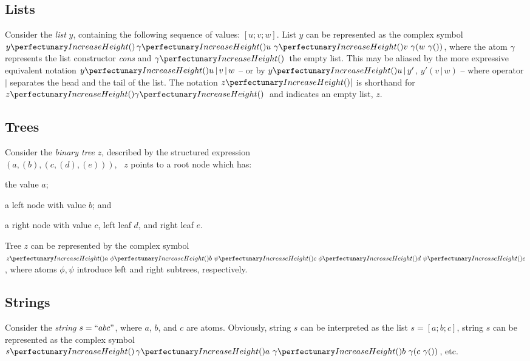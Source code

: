 \subsection{\label{sec:cps:lists}Lists}
Consider the \emph{list} \(y\), containing the following sequence of values: 
\([u; v; w]\). 
List \(y\) can be represented as the complex symbol
\(\cpfunc{y}{\, \cpfunc{\gamma}{u~\cpfunc{\gamma}{v~\cpfunc*{\gamma}{w~\cpfunc*{\gamma}{}}}}}\), 
where the \adhoc{} atom \(\gamma\) represents the list constructor \emph{cons} and \(\cpfunc{\gamma}{\,}\) the empty list.
This may be aliased by the more expressive equivalent notation
\(\cpfunc{y}{u\,|\,v\,|\,w}\)
-- or by \(\cpfunc{y}{u\,|\,y'}\), \(y'(v\,|\,w)\) --
where operator \(\mid\) separates the head and the tail of the list.
The notation \(\cpfunc{z}{|}\) is shorthand for \(\cpfunc{z}{\cpfunc{\gamma}{\,}}\) and indicates an empty list, \(z\).

\subsection{Trees}
Consider the \emph{binary tree} \(z\), described by the structured expression \\
\((a, (b), (c, (d), (e)))\), 
\ie{}~\(z\) points to a root node which has: 
\begin{inparaenum}[(i)]
\item the value \(a\); 
\item a left node with value \(b\); and 
\item a right node with value \(c\), left leaf \(d\), and right leaf \(e\). 
\end{inparaenum}
Tree \(z\) can be represented by the complex symbol
\(\cpfunc{z}{a ~ \cpfunc{\phi}{b} ~ \cpfunc{\psi}{c ~ \cpfunc{\phi}{d} ~ \cpfunc{\psi}{e}}}\), 
where \adhoc{} atoms \(\phi, \psi\) introduce left and right subtrees, respectively.

\subsection{Strings}
Consider the \emph{string} \(s = ``abc"\), 
where \(a\), \(b\), and \(c\) are atoms. 
Obviously, string \(s\) can be interpreted as the list \(s = [a; b; c]\), \ie{}
string \(s\) can be represented as the complex symbol
\(\cpfunc{s}{\, \cpfunc{\gamma}{a~\cpfunc{\gamma}{b~\cpfunc*{\gamma}{c~\cpfunc*{\gamma}{}}}}}\), etc.
